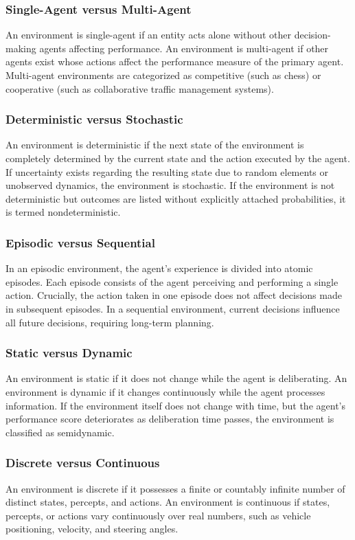 \documentclass[12pt]{report}
\begin{document}
\subsubsection{Single-Agent versus Multi-Agent}
An environment is single-agent if an entity acts alone without other decision-making agents affecting performance. An environment is multi-agent if other agents exist whose actions affect the performance measure of the primary agent. Multi-agent environments are categorized as competitive (such as chess) or cooperative (such as collaborative traffic management systems).

\subsubsection{Deterministic versus Stochastic}
An environment is deterministic if the next state of the environment is completely determined by the current state and the action executed by the agent. If uncertainty exists regarding the resulting state due to random elements or unobserved dynamics, the environment is stochastic. If the environment is not deterministic but outcomes are listed without explicitly attached probabilities, it is termed nondeterministic.

\subsubsection{Episodic versus Sequential}
In an episodic environment, the agent's experience is divided into atomic episodes. Each episode consists of the agent perceiving and performing a single action. Crucially, the action taken in one episode does not affect decisions made in subsequent episodes. In a sequential environment, current decisions influence all future decisions, requiring long-term planning.

\subsubsection{Static versus Dynamic}
An environment is static if it does not change while the agent is deliberating. An environment is dynamic if it changes continuously while the agent processes information. If the environment itself does not change with time, but the agent's performance score deteriorates as deliberation time passes, the environment is classified as semidynamic.

\subsubsection{Discrete versus Continuous}
An environment is discrete if it possesses a finite or countably infinite number of distinct states, percepts, and actions. An environment is continuous if states, percepts, or actions vary continuously over real numbers, such as vehicle positioning, velocity, and steering angles.
\end{document}
